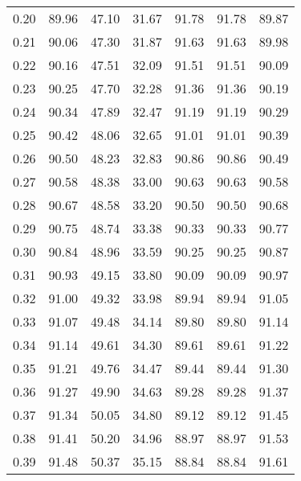\begin{tabular}{|c|c|c|c|c|c|c|}
      0.20 &     89.96 &     47.10 &      31.67 &   91.78 &      91.78 &         89.87 \\
      0.21 &     90.06 &     47.30 &      31.87 &   91.63 &      91.63 &         89.98 \\
      0.22 &     90.16 &     47.51 &      32.09 &   91.51 &      91.51 &         90.09 \\
      0.23 &     90.25 &     47.70 &      32.28 &   91.36 &      91.36 &         90.19 \\
      0.24 &     90.34 &     47.89 &      32.47 &   91.19 &      91.19 &         90.29 \\
      0.25 &     90.42 &     48.06 &      32.65 &   91.01 &      91.01 &         90.39 \\
      0.26 &     90.50 &     48.23 &      32.83 &   90.86 &      90.86 &         90.49 \\
      0.27 &     90.58 &     48.38 &      33.00 &   90.63 &      90.63 &         90.58 \\
      0.28 &     90.67 &     48.58 &      33.20 &   90.50 &      90.50 &         90.68 \\
      0.29 &     90.75 &     48.74 &      33.38 &   90.33 &      90.33 &         90.77 \\
      0.30 &     90.84 &     48.96 &      33.59 &   90.25 &      90.25 &         90.87 \\
      0.31 &     90.93 &     49.15 &      33.80 &   90.09 &      90.09 &         90.97 \\
      0.32 &     91.00 &     49.32 &      33.98 &   89.94 &      89.94 &         91.05 \\
      0.33 &     91.07 &     49.48 &      34.14 &   89.80 &      89.80 &         91.14 \\
      0.34 &     91.14 &     49.61 &      34.30 &   89.61 &      89.61 &         91.22 \\
      0.35 &     91.21 &     49.76 &      34.47 &   89.44 &      89.44 &         91.30 \\
      0.36 &     91.27 &     49.90 &      34.63 &   89.28 &      89.28 &         91.37 \\
      0.37 &     91.34 &     50.05 &      34.80 &   89.12 &      89.12 &         91.45 \\
      0.38 &     91.41 &     50.20 &      34.96 &   88.97 &      88.97 &         91.53 \\
      0.39 &     91.48 &     50.37 &      35.15 &   88.84 &      88.84 &         91.61 \\

\end{tabular}
